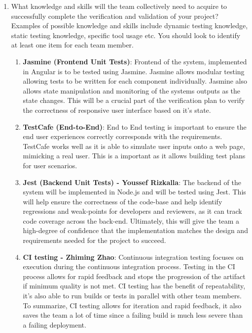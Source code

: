 \documentclass[12pt, titlepage]{article}
\begin{document}
\begin{enumerate}
  \item What knowledge and skills will the team collectively need to acquire to
  successfully complete the verification and validation of your project?
  Examples of possible knowledge and skills include dynamic testing knowledge,
  static testing knowledge, specific tool usage etc.  You should look to
  identify at least one item for each team member.
  
  \begin{enumerate}
    \item  \textbf{Jasmine (Frontend Unit Tests)}: Frontend of the system, implemented in Angular is to be tested using Jasmine. Jasmine allows modular testing allowing tests to be written for each component individually. Jasmine also allows state manipulation and monitoring of the systems outputs as the state changes. This will be a crucial part of the verification plan to verify the correctness of responsive user interface based on it's state.
    
    \item  \textbf{TestCafe (End-to-End)}: End to End testing is important to ensure the end user experiences correctly corresponds with the requirements. TestCafe works well as it is able to simulate user inputs onto a web page, mimicking a real user. This is a important as it allows building test plans for user scenarios.
    
    \item \textbf{Jest (Backend Unit Tests) - Youssef Rizkalla}: The backend of the system will be implemented in Node.js and will be tested using Jest. This will help ensure the correctness of the code-base and help identify regressions and weak-points for developers and reviewers, as it can track code coverage across the back-end. Ultimately, this will give the team a high-degree of confidence that the implementation matches the design and requirements needed for the project to succeed.
    
    \item  \textbf{CI testing - Zhiming Zhao}:
    Continuous integration testing focuses on execution during the continuous integration process. Testing in the CI process allows for rapid feedback and stops the progression of the artifact if minimum quality is not met. CI testing has the benefit of repeatability, it's also able to run builds or tests in parallel with other team members. To summarize, CI testing allows for iteration and rapid feedback, it also saves the team a lot of time since a failing build is much less severe than a failing deployment.
    

\end{enumerate}
\end{enumerate}
\end{document}
